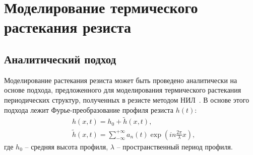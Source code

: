 \section{Моделирование термического растекания резиста}


\subsection{Аналитический подход}
Моделирование растекания резиста может быть проведено аналитически на основе подхода, предложенного для моделирования термического растекания периодических структур, полученных в резисте методом НИЛ~\cite{Leveder_2008, Leveder_2011}. В основе этого подхода лежит Фурье-преобразование профиля резиста $h(t)$:
\begin{equation}
	\begin{aligned}
		& h(x, t) = h_0 + \tilde{h}(x, t), \\
		& \tilde{h}(x, t) = \sum_{-\infty}^{+\infty} a_n(t) \exp \left(i n \frac{2 \pi}{\lambda} x\right),
	\end{aligned}
\end{equation}
где $h_0$ -- средняя высота профиля, $\lambda$ -- пространственный период профиля.

